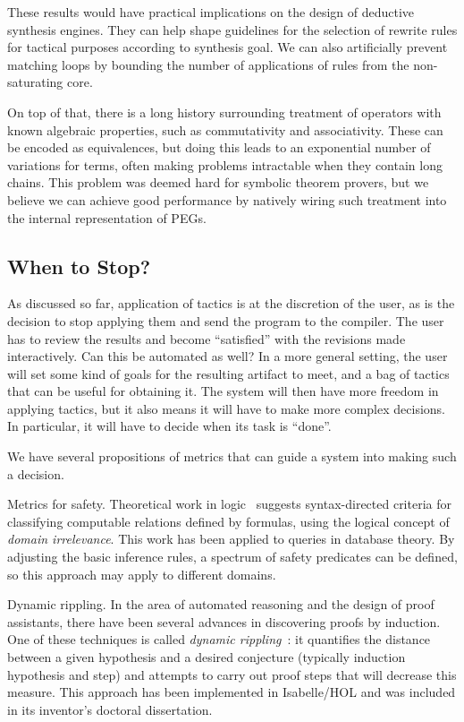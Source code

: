 These results would have practical implications on the design of
deductive synthesis engines.
They can help shape guidelines for the selection of rewrite rules for
tactical purposes according to synthesis goal.
We can also artificially prevent matching loops by bounding the number of
applications of rules from the non-saturating core.

On top of that, there is a long history surrounding treatment of
operators with known algebraic properties, such as commutativity
and associativity.
These can be encoded as equivalences, but doing this leads to an exponential
number of variations for terms, often making problems intractable when
they contain long chains.
This problem was deemed hard for symbolic theorem provers, but we
believe we can achieve good performance by natively wiring such treatment
into the internal representation of PEGs.

\subsection{When to Stop?}

As discussed so far, application of tactics is at the discretion of the
user, as is the decision to stop applying them and send the program to
the compiler.
The user has to review the results and become ``satisfied'' with the revisions made interactively.
Can this be automated as well?
In a more general setting, the user will set some kind of goals for the
resulting artifact to meet, and a bag of tactics that can be useful for
obtaining it.
The system will then have more freedom in applying tactics, but it also
means it will have to make more complex decisions.
In particular, it will have to decide when its task is ``done''.

We have several propositions of metrics that can guide a system into
making such a decision.

\begin{paragraph}{Metrics for safety.} 
Theoretical work in logic~\cite{MLCS1994/Avron} suggests syntax-directed
criteria for classifying computable relations defined by formulas,
using the logical concept of \emph{domain irrelevance}.
This work has been applied to queries in database theory.
By adjusting the basic inference rules, a spectrum of safety predicates can
be defined, so this approach may apply to different domains.
\end{paragraph}

\begin{paragraph}{Dynamic rippling.}
In the area of automated reasoning and the design of proof assistants,
there have been several advances in discovering proofs by induction.
One of these techniques is called \emph{dynamic rippling}~\cite{Festschrift2017/JohanssonDB10}:
it quantifies the distance between a given hypothesis and a desired conjecture
(typically induction hypothesis and step) and attempts to carry out proof
steps that will decrease this measure.
This approach has been implemented in Isabelle/HOL and was included in
its inventor's doctoral dissertation.
\end{paragraph}


